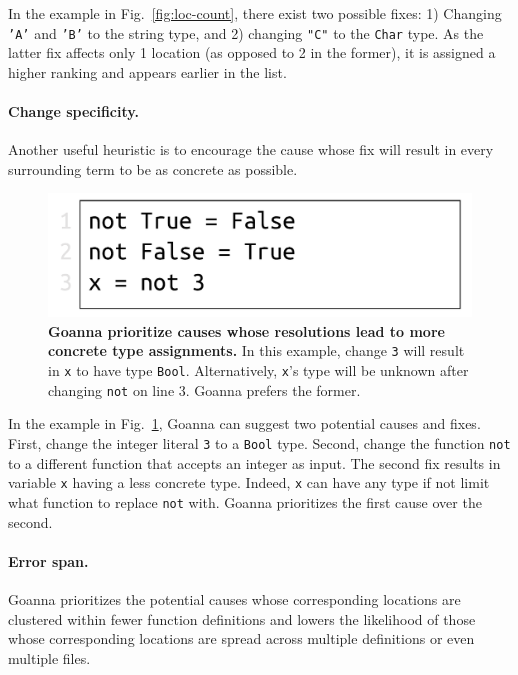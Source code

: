 \documentclass[pdflatex,sn-mathphys-num]{sn-jnl}%
\begin{document}
    In the example in Fig.~\ref{fig:loc-count}, there exist two possible fixes: 1) Changing \texttt{'A'} and \texttt{'B'} to the string type, and 2) changing \texttt{"C"} to the \texttt{Char} type. As the latter fix affects only 1 location (as opposed to 2 in the former), it is assigned a higher ranking and appears earlier in the list.

    \paragraph{Change specificity.}
	Another useful heuristic is to encourage the cause whose fix will result in every surrounding term to be as concrete as possible.
	
	
   \begin{figure}[ht!]
        \centering
        \includegraphics[width=0.5\linewidth]{images/Specificity}
        \caption[Goanna prioritize causes whose resolutions lead to more concrete type assignments]{\textbf{Goanna prioritize causes whose resolutions lead to more concrete type assignments.} In this example, change \texttt{3} will result in \texttt{x} to have type \texttt{Bool}. Alternatively, \texttt{x}'s type will be unknown after changing \texttt{not} on line 3. Goanna prefers the former.} 
        \label{fig:specificity}
    \end{figure}

    In the example in Fig.~\ref{fig:specificity}, Goanna can suggest two potential causes and fixes. First, change the integer literal \texttt{3} to a \texttt{Bool} type. Second, change the function \texttt{not} to a different function that accepts an integer as input. The second fix results in variable \texttt{x} having a less concrete type. Indeed, \texttt{x} can have any type if not limit what function to replace \texttt{not} with. Goanna prioritizes the first cause over the second. 

    \paragraph{Error span.}
    Goanna prioritizes the potential causes whose corresponding locations are clustered within fewer function definitions and lowers the likelihood of those whose corresponding locations are spread across multiple definitions or even multiple files.  
\end{document}
